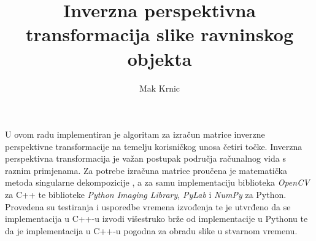 \documentclass[times, utf8, zavrsni, numeric]{fer}
\begin{document}

\title{Inverzna perspektivna transformacija slike ravninskog objekta}

\author{Mak Krnic}

\maketitle

\izvornik

\zahvala{}

\tableofcontents












\begin{sazetak}

U ovom radu implementiran je algoritam za izračun matrice inverzne perspektivne transformacije na temelju korisničkog unosa četiri točke. Inverzna perspektivna transformacija je važan postupak područja računalnog vida s raznim primjenama. Za potrebe izračuna matrice proučena je matematička metoda singularne dekompozicije , a za samu implementaciju biblioteka \emph{OpenCV} za C++ te biblioteke \emph{Python Imaging Library}, \emph{PyLab} i \emph{NumPy} za Python. Provedena su testiranja i usporedbe vremena izvođenja te je utvrđeno da se implementacija u C++-u izvodi višestruko brže od implementacije u Pythonu te da je implementacija u C++-u pogodna za obradu slike u stvarnom vremenu.

\end{sazetak}
\end{document}
